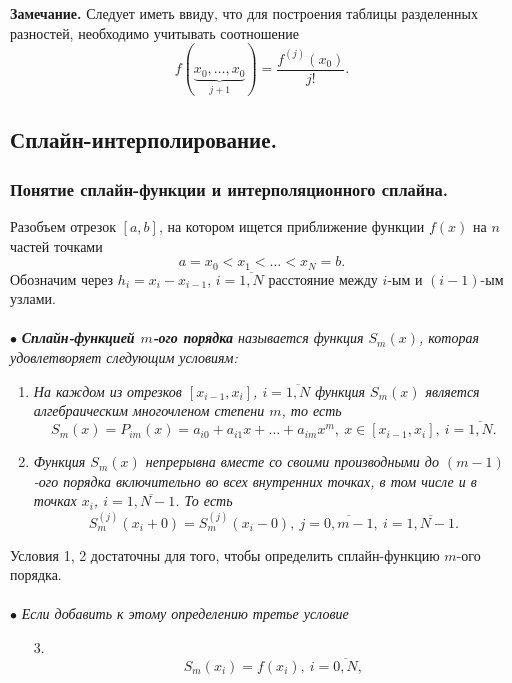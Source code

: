 \documentclass[a4paper, 12pt]{report}
\numberwithin{equation}{section}
\begin{document}
	 \textbf{Замечание.} Следует иметь ввиду, что для построения таблицы разделенных разностей, необходимо учитывать соотношение 
	 \begin{equation}
	 	f(\underbrace{x_0,\ldots, x_0}_{j+1}) = \dfrac{f^{(j)}(x_0)}{j!}.
	 \end{equation}
	 \subsection{Сплайн-интерполирование.}
	 \subsubsection{Понятие сплайн-функции и интерполяционного сплайна.}
	 Разобъем отрезок $[a,b]$, на котором ищется приближение функции $f(x)$ на $n$ частей точками $$a=x_0 < x_1 < \ldots < x_N = b.$$
	 Обозначим через $h_i=x_i - x_{i-1}$, $i=\overline{1,N}$ расстояние между $i$-ым и $(i-1)$-ым узлами.\\\\ 
	 $\bullet$ \textit{\textbf{Сплайн-функцией $m$-ого порядка} называется функция $S_m(x)$, которая удовлетворяет следующим условиям:}
	 \begin{enumerate}
	 	\item \textit{На каждом из отрезков $[x_{i-1}, x_i]$, $i=\overline{1,N}$ функция $S_m(x)$ является алгебраическим многочленом степени $m$, то есть} \begin{equation}
	 		S_m(x) = P_{im}(x) = a_{i0} + a_{i1}x + \ldots + a_{im}x^m,\ x\in [x_{i-1}, x_i],\ i=\overline{1,N}.
	 	\end{equation}
	 	\item \textit{Функция $S_m(x)$ непрерывна вместе со своими производными до $(m-1)$-ого порядка включительно во всех внутренних точках, в том числе и в точках $x_i$, $i=\overline{1,N-1}$. То есть} \begin{equation}
	 			S_m^{(j)}(x_i+0) = S_m^{(j)}(x_i-0),\ j=\overline{0, m-1}, \ i=\overline{1, N-1}.
	 		\end{equation}
	 \end{enumerate}
	 Условия 1, 2 достаточны для того, чтобы определить сплайн-функцию $m$-ого порядка. \\\\
	 $\bullet$ \textit{Если добавить к этому определению третье условие}
	 \begin{enumerate}
	 	\item [3.]
	 	\begin{equation}
	 		S_m(x_i) = f(x_i),\ i=\overline{0,N},
	 	\end{equation}
	 \end{enumerate}
\end{document}
